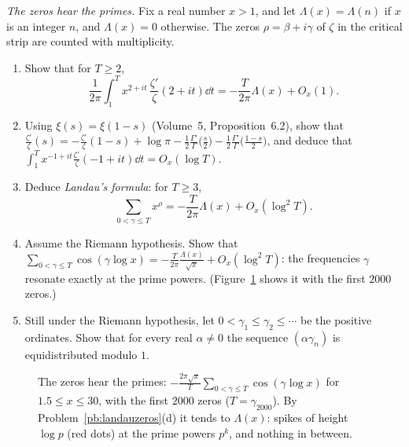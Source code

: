 \begin{exercise}[Journey]\label{pb:landauzeros}
\emph{The zeros hear the primes.} Fix a real number $x>1$, and let $\Lambda(x)=\Lambda(n)$ if $x$ is an integer $n$, and $\Lambda(x)=0$ otherwise. The zeros
$\rho=\beta+i\gamma$ of $\zeta$ in the critical strip are counted with multiplicity.
\begin{enumerate}[label=(\alph*)]
\item Show that for $T\ge2$,
\[
\frac1{2\pi}\int_1^Tx^{2+it}\,\frac{\zeta'}\zeta(2+it)\dd t=-\frac T{2\pi}\Lambda(x)+O_x(1).
\]
\item Using $\xi(s)=\xi(1-s)$ (Volume~5, Proposition~6.2), show that
$\frac{\zeta'}\zeta(s)=-\frac{\zeta'}\zeta(1-s)+\log\pi-\frac12\frac{\Gamma'}\Gamma\bigl(\frac s2\bigr)-\frac12\frac{\Gamma'}\Gamma\bigl(\frac{1-s}2\bigr)$, and deduce that
$\int_1^Tx^{-1+it}\frac{\zeta'}\zeta(-1+it)\dd t=O_x(\log T)$.
\item Deduce \emph{Landau's formula}: for $T\ge3$,
\[
\sum_{0<\gamma\le T}x^\rho=-\frac T{2\pi}\Lambda(x)+O_x(\log^2T).
\]
\item Assume the Riemann hypothesis. Show that $\sum_{0<\gamma\le T}\cos(\gamma\log x)=-\frac T{2\pi}\frac{\Lambda(x)}{\sqrt x}+O_x(\log^2T)$: the frequencies $\gamma$
resonate exactly at the prime powers. (Figure~\ref{fig:landau} shows it with the first $2000$ zeros.)
\item Still under the Riemann hypothesis, let $0<\gamma_1\le\gamma_2\le\cdots$ be the positive ordinates. Show that for every real $\alpha\ne0$ the sequence
$(\alpha\gamma_n)$ is equidistributed modulo $1$.
\end{enumerate}
\end{exercise}

\begin{figure}[ht]
\centering
{}
\caption{The zeros hear the primes: $-\frac{2\pi\sqrt x}T\sum_{0<\gamma\le T}\cos(\gamma\log x)$ for $1.5\le x\le30$, with the first $2000$ zeros
($T=\gamma_{2000}$). By Problem~\ref{pb:landauzeros}(d) it tends to $\Lambda(x)$: spikes of height $\log p$ (red dots) at the prime powers $p^k$, and nothing in
between.}\label{fig:landau}
\end{figure}


